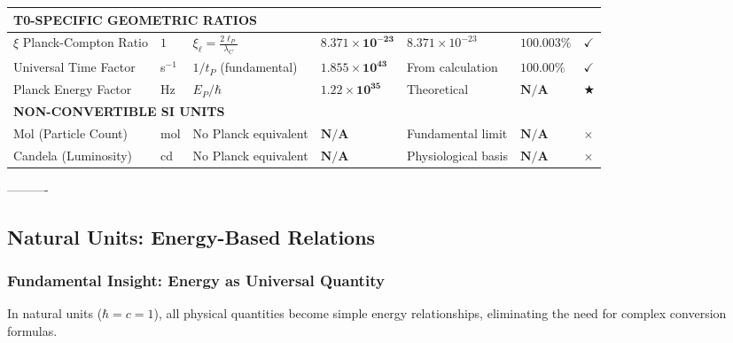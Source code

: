 \documentclass[12pt,a4paper]{article}
\newcommand{\checked}{\checkmark}
\begin{document}
\begin{landscape}
\begin{longtable}{p{4.5cm}p{2cm}p{4cm}p{3.5cm}p{3.5cm}p{2cm}p{1cm}}
		\multicolumn{7}{l}{\textbf{T0-SPECIFIC GEOMETRIC RATIOS}} \\
		\midrule
		$\xi$ Planck-Compton Ratio & $1$ & $\xi_{\ell} = \frac{2\ell_P}{\lambda_C}$ & $\mathbf{8.371 \times 10^{-23}}$ & $8.371 \times 10^{-23}$ & $\mathbf{100.003\%}$ & $\checked$ \\
		
		Universal Time Factor & s$^{-1}$ & $1/t_P$ (fundamental) & $\mathbf{1.855 \times 10^{43}}$ & From calculation & $\mathbf{100.00\%}$ & $\checked$ \\
		
		Planck Energy Factor & Hz & $E_P/\hbar$ & $\mathbf{1.22 \times 10^{35}}$ & Theoretical & $\mathbf{N/A}$ & $\bigstar$ \\
		
		\multicolumn{7}{l}{\textbf{NON-CONVERTIBLE SI UNITS}} \\
		\midrule
		Mol (Particle Count) & mol & No Planck equivalent & $\mathbf{N/A}$ & Fundamental limit & $\mathbf{N/A}$ & $\times$ \\
		
		Candela (Luminosity) & cd & No Planck equivalent & $\mathbf{N/A}$ & Physiological basis & $\mathbf{N/A}$ & $\times$ \\
	\end{longtable}
	\normalsize
	
----------


	
	\subsection{Natural Units: Energy-Based Relations}
	\label{subsec:natural_units_energy}
	
	\subsubsection{Fundamental Insight: Energy as Universal Quantity}
	\label{subsubsec:energy_universal}
	
	In natural units ($\hbar = c = 1$), all physical quantities become simple energy relationships, eliminating the need for complex conversion formulas.
	

\end{landscape}
\end{document}
